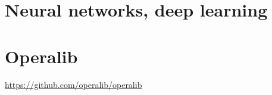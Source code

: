 \section{Neural networks, deep learning}

\section{Operalib}
\url{https://github.com/operalib/operalib}
